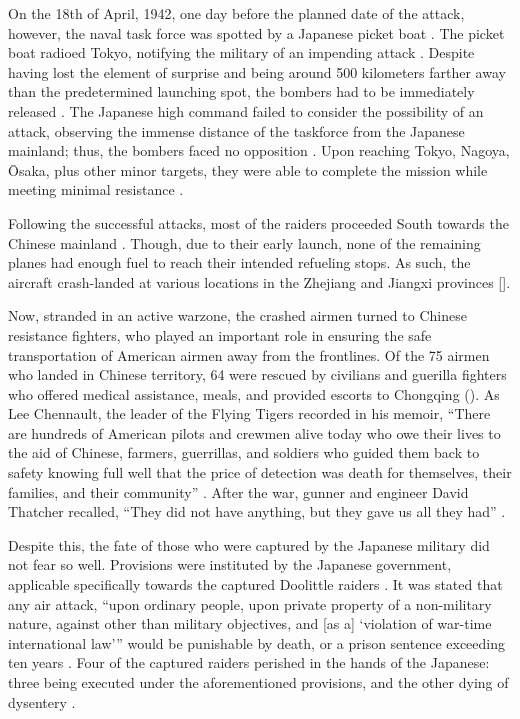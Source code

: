 \documentclass[12pt, a4paper, twoside]{article}
\begin{document}
On the 18th of April, 1942, one day before the planned date of the attack, however, the naval task force was spotted by a Japanese picket boat \autocite[p.\ 442]{CravenCate1948AAFWW2Vol1}. The picket boat radioed Tokyo, notifying the military of an impending attack \autocite[p.\ 45]{Chun2006DoolittleRaid}. Despite having lost the element of surprise and being around 500 kilometers farther away than the predetermined launching spot, the bombers had to be immediately released \autocite{Correll2009DoolittlesRaid}. The Japanese high command failed to consider the possibility of an attack, observing the immense distance of the taskforce from the Japanese mainland; thus, the bombers faced no opposition \autocite[p.\ 441]{CravenCate1948AAFWW2Vol1}. Upon reaching Tokyo, Nagoya, Ōsaka, plus other minor targets, they were able to complete the mission while meeting minimal resistance \autocite{ArmyAirForces1942DoolittleReport}.

Following the successful attacks, most of the raiders proceeded South towards the Chinese mainland \autocite{Britannica2024DoolittleRaid}. Though, due to their early launch, none of the remaining planes had enough fuel to reach their intended refueling stops. As such, the aircraft crash-landed at various locations in the Zhejiang and Jiangxi provinces [\cites{Britannica2024DoolittleRaid}{Doolittle1942GeneralReportJapaneseRaid}].

Now, stranded in an active warzone, the crashed airmen turned to Chinese resistance fighters, who played an important role in ensuring the safe transportation of American airmen away from the frontlines. Of the 75 airmen who landed in Chinese territory, 64 were rescued by civilians and guerilla fighters who offered medical assistance, meals, and provided escorts to Chongqing (\cites{Leng2023DoolittleFriendshipGlobalTimes}{Walsh1992WPMeetAgaina}). As Lee Chennault, the leader of the Flying Tigers recorded in his memoir, “There are hundreds of American pilots and crewmen alive today who owe their lives to the aid of Chinese, farmers, guerrillas, and soldiers who guided them back to safety knowing full well that the price of detection was death for themselves, their families, and their community” \autocite[p.\ 169]{Hotz1949WayOfAFighter}. After the war, gunner and engineer David Thatcher recalled, “They did not have anything, but they gave us all they had” \autocite{Zhuang2018AfterTheAirRaidSCMP}.

Despite this, the fate of those who were captured by the Japanese military did not fear so well. Provisions were instituted by the Japanese government, applicable specifically towards the captured Doolittle raiders \autocite[p.\ 70]{Liverpool2008KnightsOfBushido}. It was stated that any air attack, “upon ordinary people, upon private property of a non-military nature, against other than military objectives, and [as a] ‘violation of war-time international law’” would be punishable by death, or a prison sentence exceeding ten years \autocite[pp.\ 70--71]{Liverpool2008KnightsOfBushido}. Four of the captured raiders perished in the hands of the Japanese: three being executed under the aforementioned provisions, and the other dying of dysentery \autocite{Britannica2024DoolittleRaid}. 
\end{document}
